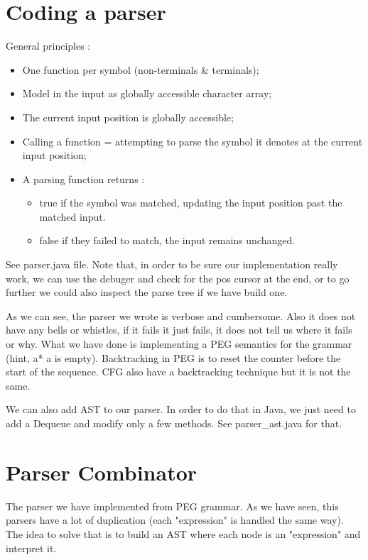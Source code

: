     \section{Coding a parser}
        General principles : 
        \begin{itemize}
            \item One function per symbol (non-terminals \& terminals);
            \item Model in the input as globally accessible character array;
            \item The current input position is globally accessible;
            \item Calling a function = attempting to parse the symbol it denotes
            at the current input position;
            \item A parsing function returns : 
                \begin{itemize}
                    \item true if the symbol was matched, updating the input
                    position past the matched input.
                    \item false if they failed to match, the input remains
                    unchanged.
                \end{itemize}
        \end{itemize}
        See parser.java file. Note that, in order to be sure our implementation
        really work, we can use the debuger and check for the pos cursor at the
        end, or to go further we could also inspect the parse tree if we have
        build one. 

        As we can see, the parser we wrote is verbose and cumbersome. Also it
        does not have any bells or whistles, if it fails it just fails, it does
        not tell us where it fails or why. What we have done is implementing a
        PEG semantics for the grammar (hint, a* a is empty). Backtracking in PEG
        is to reset the counter before the start of the sequence. CFG also have
        a backtracking technique but it is not the same.

        We can also add AST to our parser. In order to do that in Java, we just
        need to add a Dequeue and modify only a few methods. See parser\_ast.java
        for that.

    \section{Parser Combinator}
        The parser we have implemented from PEG grammar. As we have seen, this
        parsers have a lot of duplication (each "expression" is handled the same
        way). The idea to solve that is to build an AST where each node is an
        "expression" and interpret it.

